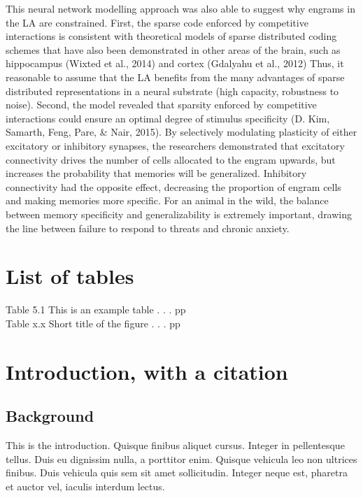 \documentclass[12pt,a4paperpaper,]{report}
\begin{document}
This neural network modelling approach was also able to suggest why
engrams in the LA are constrained. First, the sparse code enforced by
competitive interactions is consistent with theoretical models of sparse
distributed coding schemes that have also been demonstrated in other
areas of the brain, such as hippocampus (Wixted et al., 2014) and cortex
(Gdalyahu et al., 2012) Thus, it reasonable to assume that the LA
benefits from the many advantages of sparse distributed representations
in a neural substrate (high capacity, robustness to noise). Second, the
model revealed that sparsity enforced by competitive interactions could
ensure an optimal degree of stimulus specificity (D. Kim, Samarth, Feng,
Pare, \& Nair, 2015). By selectively modulating plasticity of either
excitatory or inhibitory synapses, the researchers demonstrated that
excitatory connectivity drives the number of cells allocated to the
engram upwards, but increases the probability that memories will be
generalized. Inhibitory connectivity had the opposite effect, decreasing
the proportion of engram cells and making memories more specific. For an
animal in the wild, the balance between memory specificity and
generalizability is extremely important, drawing the line between
failure to respond to threats and chronic anxiety.

\chapter*{List of tables}\label{list-of-tables}

Table 5.1 This is an example table . . . \hfill{pp}\\
Table x.x Short title of the figure . . . \hfill{pp}

\chapter{Introduction, with a
citation}\label{introduction-with-a-citation}

\section{Background}\label{background}

This is the introduction. Quisque finibus aliquet cursus. Integer in
pellentesque tellus. Duis eu dignissim nulla, a porttitor enim. Quisque
vehicula leo non ultrices finibus. Duis vehicula quis sem sit amet
sollicitudin. Integer neque est, pharetra et auctor vel, iaculis
interdum lectus.
\end{document}
